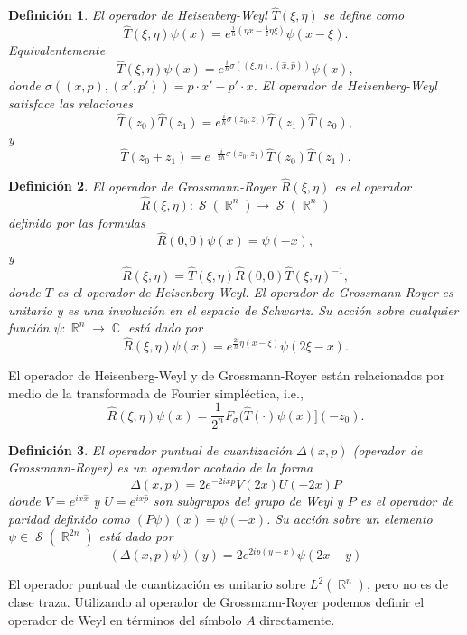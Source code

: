 \documentclass[a4paper]{report}
\DeclareMathOperator{\R}{\mathbb{R}}
\DeclareMathOperator{\C}{\mathbb{C}}
\DeclareMathOperator{\Sz}{\mathcal S}
\newtheorem{definition}{Definición}
\begin{document}
  \begin{definition}
    El operador de Heisenberg-Weyl $\hat{T}(\xi,\eta)$ se
    define como
    \[
      \hat{T}(\xi,\eta)\psi(x)
      = e^{\frac{i}{\hbar} (\eta x - \frac{1}{2} \eta
      \xi)}\psi(x - \xi).
    \] 
    Equivalentemente
    \[
      \hat{T}(\xi,\eta)\psi(x)
      = e^{\frac{i}{\hbar} \sigma((\xi,\eta),
      (\hat{x},\hat{p}))}\psi(x),
    \] 
    donde $\sigma((x,p),(x',p')) = p \cdot x' - p' \cdot x$.
    El operador de Heisenberg-Weyl satisface las relaciones
    \[
      \hat{T}(z_0)\hat{T}(z_1)
      = e^{\frac{i}{\hbar} \sigma(z_0,z_1)}
      \hat{T}(z_1)\hat{T}(z_0),
    \] 
    y
    \[
      \hat{T}(z_0+z_1)
      = e^{-\frac{i}{2\hbar} \sigma(z_0,z_1)}
      \hat{T}(z_0)\hat{T}(z_1).
    \] 
  \end{definition}
  \begin{definition}
    El operador de Grossmann-Royer $\hat{R}(\xi,\eta)$ es el
    operador
    \[
      \hat{R}(\xi,\eta) : \Sz(\R^{n}) \to \Sz(\R^{n})
    \] 
    definido por las formulas 
    \[
      \hat{R}(0,0)\psi(x)
      = \psi(-x),
    \]
    y
    \[
      \hat{R}(\xi,\eta)
      = \hat{T}(\xi,\eta) \hat{R}(0,0)
      \hat{T}(\xi,\eta)^{-1},
    \] 
    donde $T$ es el operador de Heisenberg-Weyl. El operador
    de Grossmann-Royer es unitario y es una involución en el
    espacio de Schwartz. Su acción sobre cualquier función
    $\psi : \R^{n} \to \C$ está dado por
    \[
      \hat{R}(\xi,\eta)\psi(x)
      = e^{\frac{2i}{\hbar} \eta (x - \xi)}\psi(2\xi - x).
    \] 
  \end{definition}
  El operador de Heisenberg-Weyl y de Grossmann-Royer están
  relacionados por medio de la transformada de Fourier
  simpléctica, i.e.,
  \[
    \hat{R}(\xi,\eta)\psi(x)
    = \frac{1}{2^{n}} F_\sigma(\hat{T}(\cdot)\psi(x)](-z_0).
  \] 
  \begin{definition}
    El operador puntual de cuantización $\Delta(x,p)$
    (operador de Grossmann-Royer) es un operador acotado de
    la forma
    \begin{equation}
      \label{eqn:point_operator}
      \Delta(x,p)
      = 2e^{-2i x p} V(2x)U(-2x) P
    \end{equation} 
    donde $V = e^{ix \hat{x}}$ y $U = e^{ix \hat{p}}$ son
    subgrupos del grupo de Weyl y $P$ es el operador de
    paridad definido como $(P\psi)(x) = \psi(-x)$.  Su
    acción sobre un elemento $\psi \in \Sz(\R^{2n})$ está
    dado por
    \begin{equation}
      \label{eqn:grossmann_royer_op}
      \left(\Delta(x,p)\psi\right)(y)
      = 2e^{2i p (y-x)}\psi(2x - y)
    \end{equation}
  \end{definition}
  El operador puntual de cuantización es unitario sobre
  $L^2(\R^{n})$, pero no es de clase traza. Utilizando al
  operador de Grossmann-Royer podemos definir el operador de
  Weyl en términos del símbolo $A$ directamente.
  
\end{document}
